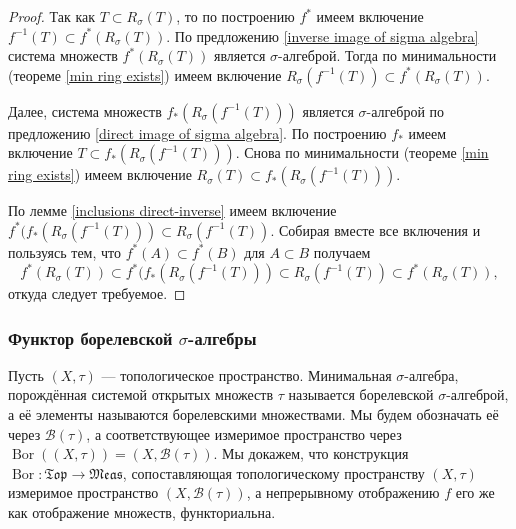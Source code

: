 \documentclass[12pt]{article}
\numberwithin{theorem}{section}
\theoremstyle{definition}
\newcommand{\calB}{\mathcal{B}}
\newcommand{\defin}[2]{\hypertarget{#2}{{\color{red} #1}}}
\newcommand{\Bor}{\operatorname{Bor}}
\newcommand{\Top}{\mathfrak{Top}}
\newcommand{\Meas}{\mathfrak{Meas}}
\begin{document}
	\begin{proof}
		Так как $ T \subset R_{\sigma}(T) $, то по построению $ f^* $ имеем включение $ f^{-1}(T) \subset f^*(R_{\sigma}(T)) $.
		По предложению \ref{inverse image of sigma algebra} система множеств $ f^*(R_{\sigma}(T)) $ является $ \sigma $-алгеброй.
		Тогда по минимальности (теореме \ref{min ring exists}) 
		имеем включение $ R_{\sigma}(f^{-1}(T)) \subset f^{*}(R_{\sigma}(T)) $.
		
		Далее, система множеств $ f_*(R_{\sigma}(f^{-1}(T))) $ является $ \sigma $-алгеброй по предложению
		\ref{direct image of sigma algebra}. По построению $ f_* $ имеем включение $ T \subset f_*(R_{\sigma}(f^{-1}(T))) $.
		Снова по минимальности (теореме \ref{min ring exists}) имеем включение $ R_{\sigma}(T) \subset f_*(R_{\sigma}(f^{-1}(T))) $.
		
		По лемме \ref{inclusions direct-inverse} имеем включение $ f^*(f_*(R_{\sigma}(f^{-1}(T))) \subset R_{\sigma}(f^{-1}(T)) $.
		Собирая вместе все включения и пользуясь тем, что $ f^*(A) \subset f^*(B) $ для $ A \subset B $ получаем
		$$ f^*(R_{\sigma}(T)) \subset f^*(f_*(R_{\sigma}(f^{-1}(T))) \subset R_{\sigma}(f^{-1}(T)) \subset f^{*}(R_{\sigma}(T)), $$
		откуда следует требуемое.
	\end{proof}
	
	
	\subsubsection{Функтор борелевской $ \sigma $-алгебры}
	
	Пусть $ (X, \tau) $ --- топологическое пространство.
	Минимальная $ \sigma $-алгебра, порождённая системой открытых множеств $ \tau $ 
	называется \defin{борелевской $ \sigma $-алгеброй}{borel-sigma-algebra},
	а её элементы называются \defin{борелевскими множествами}{borel-sets}.
	Мы будем обозначать её через $ \calB(\tau) $, а соответствующее измеримое пространство
	через $ \Bor((X, \tau)) = (X, \calB(\tau)) $.
	Мы докажем, что конструкция $ \Bor \colon \Top \to \Meas $, сопоставляющая топологическому пространству $ (X, \tau) $
	измеримое пространство $ (X, \calB(\tau)) $, а непрерывному отображению $ f $
	его же как отображение множеств, функториальна.
	
\end{document}

